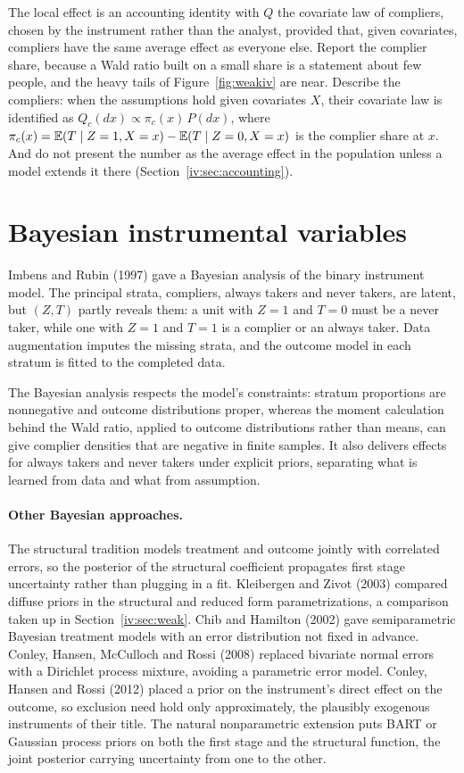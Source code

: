 The local effect is an accounting identity with $Q$ the covariate law of compliers, chosen by the instrument rather than the analyst, provided that, given covariates, compliers have the same average effect as everyone else. Report the complier share, because a Wald ratio built on a small share is a statement about few people, and the heavy tails of Figure~\ref{fig:weakiv} are near. Describe the compliers: when the assumptions hold given covariates $X$, their covariate law is identified as $Q_c(dx) \propto \pi_c(x)\,P(dx)$, where $\pi_c(x) = \mathbb{E}(T \mid Z = 1, X = x) - \mathbb{E}(T \mid Z = 0, X = x)$ is the complier share at $x$. And do not present the number as the average effect in the population unless a model extends it there (Section~\ref{iv:sec:accounting}).

\section{Bayesian instrumental variables}

Imbens and Rubin (1997) gave a Bayesian analysis of the binary instrument model. The principal strata, compliers, always takers and never takers, are latent, but $(Z, T)$ partly reveals them: a unit with $Z = 1$ and $T = 0$ must be a never taker, while one with $Z = 1$ and $T = 1$ is a complier or an always taker. Data augmentation imputes the missing strata, and the outcome model in each stratum is fitted to the completed data.

The Bayesian analysis respects the model's constraints: stratum proportions are nonnegative and outcome distributions proper, whereas the moment calculation behind the Wald ratio, applied to outcome distributions rather than means, can give complier densities that are negative in finite samples. It also delivers effects for always takers and never takers under explicit priors, separating what is learned from data and what from assumption.

\paragraph{Other Bayesian approaches.} The structural tradition models treatment and outcome jointly with correlated errors, so the posterior of the structural coefficient propagates first stage uncertainty rather than plugging in a fit. Kleibergen and Zivot (2003) compared diffuse priors in the structural and reduced form parametrizations, a comparison taken up in Section~\ref{iv:sec:weak}. Chib and Hamilton (2002) gave semiparametric Bayesian treatment models with an error distribution not fixed in advance. Conley, Hansen, McCulloch and Rossi (2008) replaced bivariate normal errors with a Dirichlet process mixture, avoiding a parametric error model. Conley, Hansen and Rossi (2012) placed a prior on the instrument's direct effect on the outcome, so exclusion need hold only approximately, the plausibly exogenous instruments of their title. The natural nonparametric extension puts BART or Gaussian process priors on both the first stage and the structural function, the joint posterior carrying uncertainty from one to the other.

